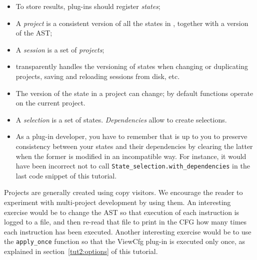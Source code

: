 \begin{itemize}
\item To store results, plug-ins should register \emph{states};
\item A \emph{project} is a consistent version of all the states in
  \framac, together with a version of the AST;
\item A \emph{session} is a set of \emph{projects};
\item \framac transparently handles the versioning of states when
  changing or duplicating projects, saving and reloading sessions from
  disk, etc.
\item The version of the state in a project can change; by default
  \framac functions operate on the current project.
\item A \emph{selection} is a set of states. \emph{Dependencies} allow
  to create selections.
\item As a plug-in developer, you have to remember that is up to you to preserve
  consistency between your states and their dependencies by clearing the latter
  when the former is modified in an incompatible way. For instance, it would
  have been incorrect not to call
  \texttt{State\_selection.with\_dependencies}
  in the last code snippet of this tutorial.
\end{itemize}

Projects are generally created using copy visitors. We encourage the reader to
experiment with multi-project development by using them. An interesting
exercise would be to change the AST so that execution of each instruction is
logged to a file, and then re-read that file to print in the CFG how many times
each instruction has been executed. Another interesting exercise would be
to use the \texttt{apply\_once} function so that the ViewCfg plug-in is executed
only once, as explained in section~\ref{tut2:options} of this tutorial.
